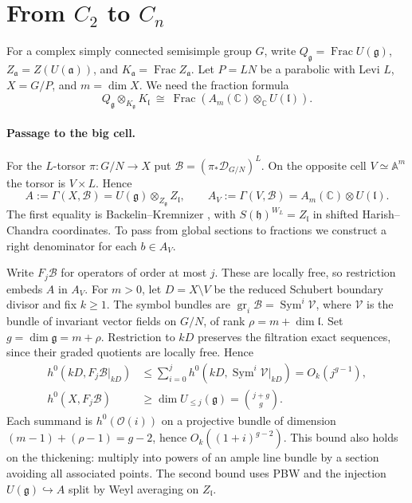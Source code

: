 \documentclass[11pt,a4paper]{article}
\renewcommand{\le}{\leqslant}\renewcommand{\ge}{\geqslant}
\newcommand{\C}{\mathbb C}
\newcommand{\Frac}{\operatorname{Frac}}
\newcommand{\gr}{\operatorname{gr}}
\theoremstyle{definition}
\begin{document}
\section{\texorpdfstring{From \(C_2\) to \(C_n\)}{From C2 to Cn}}
\label{sec:higher-symplectic}
For a complex simply connected semisimple group \(G\), write
\(Q_{\mathfrak g}=\Frac U(\mathfrak g)\),
\(Z_{\mathfrak a}=Z(U(\mathfrak a))\), and \(K_{\mathfrak a}=\Frac Z_{\mathfrak a}\).
Let \(P=LN\) be a parabolic with Levi \(L\), \(X=G/P\), and \(m=\dim X\).
We need the fraction formula
\begin{equation}\label{eq:levi-paper}
 Q_{\mathfrak g}\otimes_{K_{\mathfrak g}}K_{\mathfrak l}
 \ \cong\ \Frac\!\left(A_m(\C)\otimes_{\C} U(\mathfrak l)\right).
\end{equation}

\paragraph{Passage to the big cell.}
For the \(L\)-torsor \(\pi:G/N\to X\) put
\(\mathcal B=(\pi_*\mathcal D_{G/N})^L\). On the opposite cell
\(V\simeq\mathbb A^m\) the torsor is \(V\times L\). Hence
\[
 A:=\Gamma(X,\mathcal B)=U(\mathfrak g)\otimes_{Z_{\mathfrak g}}Z_{\mathfrak l},
 \qquad A_V:=\Gamma(V,\mathcal B)=A_m(\C)\otimes U(\mathfrak l).
\]
The first equality is Backelin--Kremnizer
\cite[Def.~4.2, Sec.~4.4 and Thm.~4.10(iii)]{BK},
with \(S(\mathfrak h)^{W_L}=Z_{\mathfrak l}\) in shifted
Harish--Chandra coordinates. To pass from global sections to fractions
we construct a right denominator for each \(b\in A_V\).

Write \(F_j\mathcal B\) for operators of order at most \(j\). These are
locally free, so restriction embeds \(A\) in \(A_V\).
For \(m>0\), let \(D=X\setminus V\) be the reduced Schubert boundary
divisor and fix \(k\ge1\). The symbol bundles are
\(\gr_i\mathcal B=\operatorname{Sym}^i\mathcal V\), where \(\mathcal V\)
is the bundle of invariant vector fields on \(G/N\),
of rank \(\rho=m+\dim\mathfrak l\). Set \(g=\dim\mathfrak g=m+\rho\).
Restriction to \(kD\) preserves the filtration exact sequences, since their graded quotients are locally free. Hence
\[
 \begin{aligned}
 h^0(kD,F_j\mathcal B|_{kD})
 &\le\sum_{i=0}^{j}h^0(kD,\operatorname{Sym}^i\mathcal V|_{kD})
   =O_k(j^{g-1}),\\
 h^0(X,F_j\mathcal B)
 &\ge\dim U_{\le j}(\mathfrak g)=\binom{j+g}{g}.
 \end{aligned}
\]
Each summand is \(h^0(\mathcal O(i))\) on a projective bundle of dimension
\((m-1)+(\rho-1)=g-2\), hence \(O_k((1+i)^{g-2})\).
This bound also holds on the thickening: multiply into powers of an ample
line bundle by a section avoiding all associated points.
The second bound uses PBW and the injection \(U(\mathfrak g)\hookrightarrow A\)
split by Weyl averaging on \(Z_{\mathfrak l}\).
\end{document}
